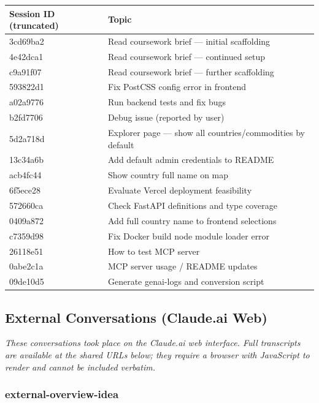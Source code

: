 \begin{tabular}{ll}
\toprule
\textbf{Session ID (truncated)} & \textbf{Topic} \\
\midrule
3cd69ba2 & Read coursework brief --- initial scaffolding \\
4e42dca1 & Read coursework brief --- continued setup \\
c9a91f07 & Read coursework brief --- further scaffolding \\
593822d1 & Fix PostCSS config error in frontend \\
a02a9776 & Run backend tests and fix bugs \\
b2fd7706 & Debug issue (reported by user) \\
5d2a718d & Explorer page --- show all countries/commodities by default \\
13c34a6b & Add default admin credentials to README \\
acb4fc44 & Show country full name on map \\
6f5ece28 & Evaluate Vercel deployment feasibility \\
572660ca & Check FastAPI definitions and type coverage \\
0409a872 & Add full country name to frontend selections \\
c7359d98 & Fix Docker build node module loader error \\
26118e51 & How to test MCP server \\
0abe2c1a & MCP server usage / README updates \\
09de10d5 & Generate genai-logs and conversion script \\
\bottomrule
\end{tabular}

\subsection{External Conversations (Claude.ai Web)}

\textit{These conversations took place on the Claude.ai web interface.
Full transcripts are available at the shared URLs below; they require a browser
with JavaScript to render and cannot be included verbatim.}

\subsubsection*{external-overview-idea}


